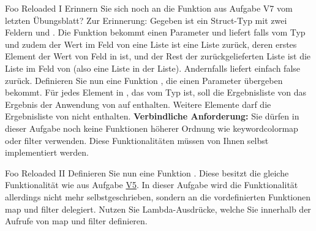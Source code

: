 \documentclass{../preamble}
\begin{document}
\begin{task}[credit = \stars{2}{3}]{Foo Reloaded I}
    \label{task:V5}
    Erinnern Sie sich noch an die Funktion  aus Aufgabe V7 vom letzten Übungsblatt? Zur Erinnerung: Gegeben ist ein Struct-Typ  mit zwei Feldern  und . Die Funktion  bekommt einen Parameter  und liefert falls  vom Typ  und zudem der Wert im Feld  von  eine Liste ist eine Liste zurück, deren erstes Element der Wert von Feld  in  ist, und der Rest der zurückgelieferten Liste ist die Liste im Feld  von  (also eine Liste in der Liste). Andernfalls liefert  einfach \textcolor{keywordcolor}{false} zurück.
    \br
    Definieren Sie nun eine Funktion , die einen Parameter  übergeben bekommt. Für jedes Element  in , das vom Typ  ist, soll die Ergebnisliste von  das Ergebnis der Anwendung von  auf  enthalten. Weitere Elemente darf die Ergebnisliste von  nicht enthalten.
    \br
    \textbf{Verbindliche Anforderung:} Sie dürfen in dieser Aufgabe noch keine Funktionen höherer Ordnung wie \textmd {keywordcolor}{map} oder \textcolor{keywordcolor}{filter} verwenden. Diese Funktionalitäten müssen von Ihnen selbst implementiert werden.

    \begin{solution}
        
    \end{solution}
\end{task}

\clearpage

\begin{task}[credit = \stars{2}{3}]{Foo Reloaded II}
    Definieren Sie nun eine Funktion . Diese besitzt die gleiche Funktionalität wie  aus Aufgabe \hyperref[task:V5]{V5}. In dieser Aufgabe wird die Funktionalität allerdings nicht mehr selbstgeschrieben, sondern an die vordefinierten Funktionen \textcolor{keywordcolor}{map} und \textcolor{keywordcolor}{filter} delegiert. Nutzen Sie Lambda-Ausdrücke, welche Sie innerhalb der Aufrufe von \textcolor{keywordcolor}{map} und \textcolor{keywordcolor}{filter} definieren.

    \begin{solution}
        
    \end{solution}
\end{task}
\end{document}
